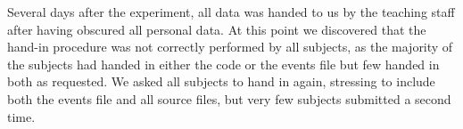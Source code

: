 
Several days after the experiment, all data was handed to us by the teaching staff after having obscured all personal data.
At this point we discovered that the hand-in procedure was not correctly performed by all subjects, as the majority of the subjects had handed in either the code or the events file but few handed in both as requested.
We asked all subjects to hand in again, stressing to include both the events file and all source files, but very few subjects submitted a second time. 

